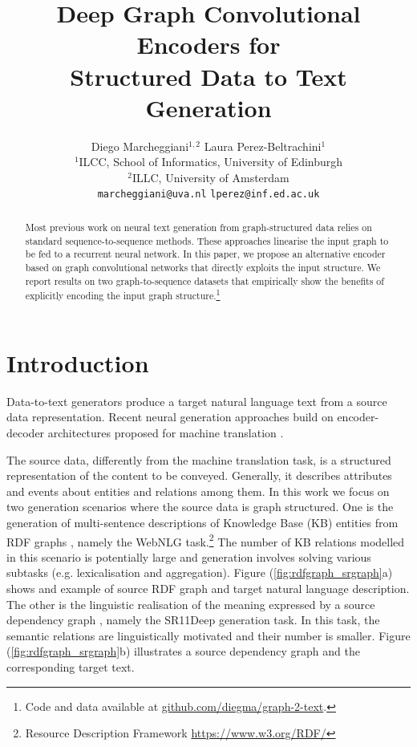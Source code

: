 \documentclass[11pt,a4paper,dvipsnames]{article}
\title{Deep Graph Convolutional Encoders for \\Structured Data to Text Generation}
\author{
 Diego Marcheggiani$^{1,2}$ \hspace{1cm} Laura Perez-Beltrachini$^{1}$\\
 $^1$ILCC, School of Informatics, University of Edinburgh \\
 $^2$ILLC,  University of Amsterdam  \\
    {\tt marcheggiani@uva.nl} \hspace{0.3cm} {\tt {lperez}@inf.ed.ac.uk} 
 }
\date{}
\begin{document}
\maketitle
\begin{abstract}
Most previous work on neural text generation from graph-structured 
data relies on standard sequence-to-sequence methods. These approaches
linearise the input graph to be fed to a recurrent neural network.
In this paper, we propose an alternative encoder based on graph 
convolutional networks that directly exploits the input structure.
We report results on two graph-to-sequence datasets that empirically 
show the benefits of explicitly encoding the input graph structure.\footnote{Code and data available at \url{github.com/diegma/graph-2-text}.}

\end{abstract}


 

\section{Introduction}

Data-to-text generators produce a target natural language text 
from a source data representation. Recent neural generation approaches 
\cite{mei2015talk,lebret-grangier-auli:2016:EMNLP2016,wiseman-shieber-rush:2017:EMNLP2017,gardent-EtAl:2017:INLG2017,ferreira2017linguistic,konstas2017neural} 
build on encoder-decoder architectures proposed for machine translation
\cite{sutskever2014sequence,bahdanau2015neural}.


The source data, differently from the machine translation task, 
is a structured representation of the content to be conveyed.
Generally, it describes attributes and events about entities and relations among them.
In this work we focus on two generation scenarios where the source
data is graph structured.
One is the generation of multi-sentence descriptions
of Knowledge Base (KB) entities from RDF graphs
\cite{perezbeltrachini-sayed-gardent:2016:COLING,gardent-EtAl:2017:Long,gardent-EtAl:2017:INLG2017},
namely the WebNLG task.\footnote{Resource Description Framework \url{https://www.w3.org/RDF/}}
The number of KB relations modelled in this scenario is potentially large and generation involves 
solving various subtasks (e.g. lexicalisation and 
aggregation). Figure (\ref{fig:rdfgraph_srgraph}a) shows and example 
of source RDF graph and target natural language description.
The other is the linguistic realisation of the meaning expressed 
by a source dependency graph \cite{belz2011first}, namely the SR11Deep generation task. 
In this task, the semantic relations are linguistically motivated and their number 
is smaller.
Figure (\ref{fig:rdfgraph_srgraph}b) illustrates a source dependency graph 
and the corresponding target text.
\end{document}
